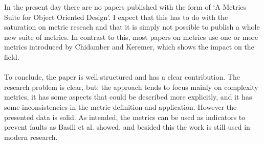 In the present day there are no papers published with the form of `A Metrics Suite for Object Oriented Design'. I expect that this has
to do with the saturation on metric reseach and that it is simply not possible to publish a whole new suite of metrics.
In contrast to this, most papers on metrics use one or more metrics introduced by Chidamber and Keremer, which shows the
impact on the field.

\paragraph{}
To conclude, the paper is well structured and has a clear contribution. The research problem is clear, but: the
approach tends to focus mainly on complexity metrics, it has some aspects that could be described more explicitly, and it
has some inconsistencies in the metric definition and application. However the presented data is solid.
As intended, the metrics can be used as indicators to prevent faults as Basili et al. \autocite{BASILI} showed, and
besided this the work is still used in modern research.
